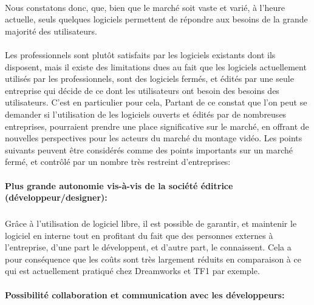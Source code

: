   \paragraph { }

  Nous constatons donc, que, bien que le marché soit vaste et varié, à l'heure actuelle, seuls
  quelques logiciels permettent de répondre aux besoins de la grande majorité des utilisateurs.

  \paragraph{}

  Les professionnels sont plutôt satisfaits par les logiciels
  existants dont ils disposent, mais il existe des limitations dues au fait que les
  logiciels actuellement utilisés par les professionnels,  sont des
  logiciels fermés, et édités par une seule entreprise qui décide
  de ce dont les utilisateurs ont besoin des besoins des utilisateurs. C'est en particulier
  pour cela, Partant de ce constat que l'on peut se demander si l'utilisation de les logiciels
  ouverts et édités par de nombreuses entreprises, pourraient prendre une
  place significative sur le marché, en offrant de nouvelles perspectives pour
  les acteurs du marché du montage vidéo. Les points suivants peuvent
  être considérés comme des points importants sur un marché fermé,
  et contrôlé par un nombre très restreint d'entreprises:

  \paragraph{Plus grande autonomie vis-à-vis de la société éditrice (développeur/designer):}

    \subparagraph{ }

      Grâce à l'utilisation de logiciel libre,
      il est possible de garantir, et maintenir le logiciel en interne tout
      en profitant du fait que des personnes externes à l'entreprise,
      d'une part le développent, et d'autre part, le connaissent. Cela
      a pour conséquence que les coûts sont très largement réduits en
      comparaison à ce qui est actuellement pratiqué chez Dreamworks
      et TF1 par  exemple.

  \paragraph{Possibilité collaboration et communication avec les développeurs:}

